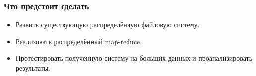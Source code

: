 \documentclass{beamer}
\begin{document}
    \begin{frame}
    \frametitle{Что предстоит сделать}
        \begin{itemize}
            \item Развить существующую распределённую файловую систему.
            \item Реализовать распределённый map-reduce.
            \item Протестировать полученную систему на больших данных и проанализировать результаты.
        \end{itemize} 
    \end{frame}

\begin{frame}
    \titlepage
\end{frame}
\end{document}
